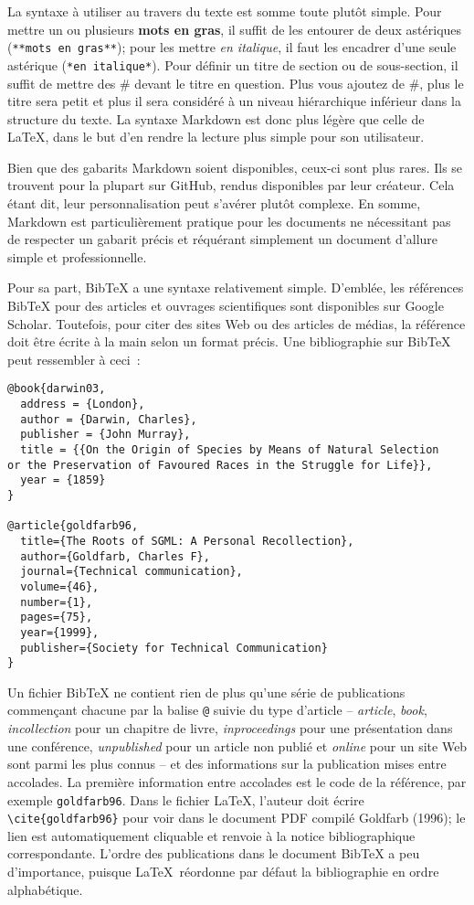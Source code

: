\documentclass[
  letterpaper,
  DIV=11,
  numbers=noendperiod]{scrreprt}
\begin{document}
La syntaxe à utiliser au travers du texte est somme toute plutôt simple.
Pour mettre un ou plusieurs \textbf{mots en gras}, il suffit de les
entourer de deux astériques (\texttt{**mots\ en\ gras**}); pour les
mettre \emph{en italique}, il faut les encadrer d'une seule astérique
(\texttt{*en\ italique*}). Pour définir un titre de section ou de
sous-section, il suffit de mettre des \# devant le titre en question.
Plus vous ajoutez de \#, plus le titre sera petit et plus il sera
considéré à un niveau hiérarchique inférieur dans la structure du texte.
La syntaxe Markdown est donc plus légère que celle de \LaTeX, dans le
but d'en rendre la lecture plus simple pour son utilisateur.

Bien que des gabarits Markdown soient disponibles, ceux-ci sont plus
rares. Ils se trouvent pour la plupart sur GitHub, rendus disponibles
par leur créateur. Cela étant dit, leur personnalisation peut s'avérer
plutôt complexe. En somme, Markdown est particulièrement pratique pour
les documents ne nécessitant pas de respecter un gabarit précis et
réquérant simplement un document d'allure simple et professionnelle.

Pour sa part, BibTeX a une syntaxe relativement simple. D'emblée, les
références BibTeX pour des articles et ouvrages scientifiques sont
disponibles sur Google Scholar. Toutefois, pour citer des sites Web ou
des articles de médias, la référence doit être écrite à la main selon un
format précis. Une bibliographie sur BibTeX peut ressembler à ceci~:

\begin{verbatim}
@book{darwin03,
  address = {London},
  author = {Darwin, Charles},
  publisher = {John Murray},
  title = {{On the Origin of Species by Means of Natural Selection
or the Preservation of Favoured Races in the Struggle for Life}},
  year = {1859}
}

@article{goldfarb96,
  title={The Roots of SGML: A Personal Recollection},
  author={Goldfarb, Charles F},
  journal={Technical communication},
  volume={46},
  number={1},
  pages={75},
  year={1999},
  publisher={Society for Technical Communication}
}
\end{verbatim}

Un fichier BibTeX ne contient rien de plus qu'une série de publications
commençant chacune par la balise \texttt{@} suivie du type d'article --
\emph{article}, \emph{book}, \emph{incollection} pour un chapitre de
livre, \emph{inproceedings} pour une présentation dans une conférence,
\emph{unpublished} pour un article non publié et \emph{online} pour un
site Web sont parmi les plus connus -- et des informations sur la
publication mises entre accolades. La première information entre
accolades est le code de la référence, par exemple \texttt{goldfarb96}.
Dans le fichier \LaTeX, l'auteur doit écrire
\texttt{\textbackslash{}cite\{goldfarb96\}} pour voir dans le document
PDF compilé Goldfarb (1996); le lien est automatiquement cliquable et
renvoie à la notice bibliographique correspondante. L'ordre des
publications dans le document BibTeX a peu d'importance, puisque
\LaTeX~réordonne par défaut la bibliographie en ordre alphabétique.
\end{document}
